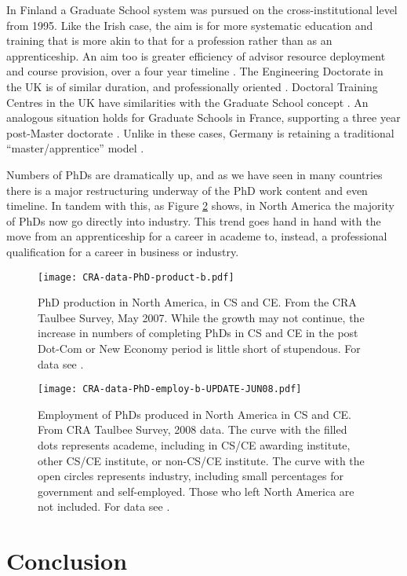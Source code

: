\documentclass{article}
\begin{document}
In Finland a Graduate School system was pursued on the cross-institutional 
level from 
1995.   Like the Irish case, the aim is for more systematic 
education and 
training that is more akin to that for a profession rather than as an 
apprenticeship.  An 
aim too is greater efficiency of advisor resource deployment and course 
provision, over a four year timeline \cite{researchfinland}.      
The Engineering Doctorate in the UK
is of similar duration, and professionally oriented \cite{epsrc1}. 
Doctoral Training Centres in the UK have similarities with 
the Graduate School concept
\cite{epsrc2}.   An
analogous situation holds for Graduate Schools in France, supporting a 
three year post-Master doctorate \cite{doctorat}. 
Unlike in these cases, Germany is retaining a traditional 
``master/apprentice'' model \cite{daad}.  

Numbers of PhDs are dramatically up, and as we have seen 
in many countries there is a 
major restructuring underway of the PhD work content and even timeline. 
In tandem with this, as Figure \ref{fig6} shows, in North America
the majority of PhDs now go directly into industry.  This trend goes 
hand in hand with the move from an apprenticeship for a career in 
academe to, instead, a professional qualification for a career in 
business or industry.  


\begin{figure}
\texttt{[image: CRA-data-PhD-product-b.pdf]}
\caption{PhD production in North America, in CS and CE.  From the 
CRA Taulbee Survey, May 2007.  While the growth may not continue, the 
increase in numbers of completing PhDs in CS and CE in the post Dot-Com 
or New Economy period is little short of stupendous.  For data see \cite{cra}.}
\label{fig5}
\end{figure}

\begin{figure}
\texttt{[image: CRA-data-PhD-employ-b-UPDATE-JUN08.pdf]}
\caption{Employment of PhDs produced in North America in CS and CE.  
From CRA Taulbee 
Survey, 2008 data. The curve with the filled dots represents 
academe, including in CS/CE awarding institute, other CS/CE institute, or 
non-CS/CE 
institute.  The curve with the open circles represents industry, including 
small 
percentages for government and self-employed.  Those who left North America 
are not included.  For data see \cite{cra}.}
\label{fig6}
\end{figure}

\section{Conclusion}
\end{document}
